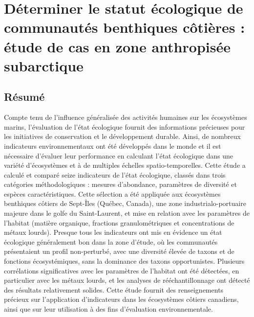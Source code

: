\chapter{Déterminer le statut écologique de communautés benthiques côtières : étude de cas en zone anthropisée subarctique}
\label{chap2}

\section{Résumé}
Compte tenu de l'influence généralisée des activités humaines sur les écosystèmes marins, l'évaluation de l'état écologique fournit des informations précieuses pour les initiatives de conservation et le développement durable. Ainsi, de nombreux indicateurs environnementaux ont été développés dans le monde et il est nécessaire d'évaluer leur performance en calculant l'état écologique dans une variété d'écosystèmes et à de multiples échelles spatio-temporelles. Cette étude a calculé et comparé seize indicateurs de l'état écologique, classés dans trois catégories méthodologiques : mesures d'abondance, paramètres de diversité et espèces caractéristiques. Cette sélection a été appliquée aux écosystèmes benthiques côtiers de Sept-Îles (Québec, Canada), une zone industrialo-portuaire majeure dans le golfe du Saint-Laurent, et mise en relation avec les paramètres de l'habitat (matière organique, fractions granulométriques et concentrations de métaux lourds). Presque tous les indicateurs ont mis en évidence un état écologique généralement bon dans la zone d'étude, où les communautés présentaient un profil non-perturbé, avec une diversité élevée de taxons et de fonctions écosystémiques, sans la dominance des taxons opportunistes. Plusieurs corrélations significatives avec les paramètres de l'habitat ont été détectées, en particulier avec les métaux lourds, et les analyses de rééchantillonnage ont détecté des résultats relativement solides. Cette étude fournit des renseignements précieux sur l'application d'indicateurs dans les écosystèmes côtiers canadiens, ainsi que sur leur utilisation à des fins d'évaluation environnementale. \linebreak[4]

